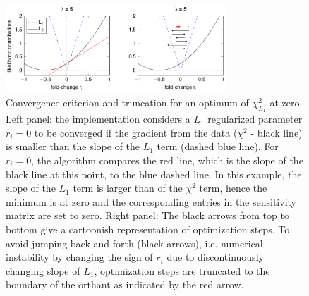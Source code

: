 \documentclass{bioinfo}
\begin{document}
\begin{figure}[!tpb]%
\centerline{\includegraphics[width=235pt]{Figures/l1_cartoon.pdf}}
\caption{Convergence criterion and truncation for an optimum of $\chi^2_{L_1}$ at zero. Left panel: the implementation considers a $L_1$ regularized parameter $r_i=0$ to be converged if the gradient from the data ($\chi^2$ - black line) is smaller than the slope of the $L_1$ term (dashed blue line). For $r_i=0$, the algorithm compares the red line, which is the slope of the black line at this point, to the blue dashed line. In this example, the slope of the $L_1$ term is larger than of the $\chi^2$ term, hence the minimum is at zero and the corresponding entries in the sensitivity matrix are set to zero. Right panel: The black arrows from top to bottom give a cartoonish representation of optimization steps. To avoid jumping back and forth (black arrows), i.e. numerical instability by changing the sign of $r_i$ due to discontinuously changing slope of $L_1$, optimization steps are truncated to the boundary of the orthant as indicated by the red arrow.}\label{fig:03}
\end{figure}
\end{document}
